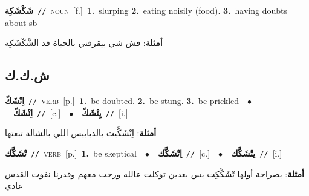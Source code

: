 \documentclass[10pt,a4paper,twoside]{article} %
\begin{document}
\begin{multicols}{2}
{\setlength\topsep{0pt}\textbf{\foreignlanguage{arabic}{شَكْشَكِة}}\ {\color{gray}\texttt{//}\color{black}}\ \textsc{noun}\ [f.]\ \textbf{1.}~slurping  \textbf{2.}~eating noisily (food).  \textbf{3.}~having doubts about sb\  \begin{flushright}\color{gray}\foreignlanguage{arabic}{\textbf{\underline{\foreignlanguage{arabic}{أمثلة}}}: فش شي بيقرفني بالحياة قد الشَّكْشَكِة}\end{flushright}\color{black}} \vspace{2mm}

\vspace{-3mm}
\subsection*{\color{blue}\foreignlanguage{arabic}{ش.ك.ك}\color{blue}{}} 

{\setlength\topsep{0pt}\textbf{\foreignlanguage{arabic}{اِنْشَكّ}}\ {\color{gray}\texttt{//}\color{black}}\ \textsc{verb}\ [p.]\ \textbf{1.}~be doubted.  \textbf{2.}~be stung.  \textbf{3.}~be prickled\ \ $\bullet$\ \ \setlength\topsep{0pt}\textbf{\foreignlanguage{arabic}{اِنْشَكّ}}\ {\color{gray}\texttt{//}\color{black}}\ [c.]\ \ $\bullet$\ \ \setlength\topsep{0pt}\textbf{\foreignlanguage{arabic}{يِنْشَكّ}}\ {\color{gray}\texttt{//}\color{black}}\ [i.]\  \begin{flushright}\color{gray}\foreignlanguage{arabic}{\textbf{\underline{\foreignlanguage{arabic}{أمثلة}}}: اِنْشَكَّيت بالدبابيس اللي بالشالة تبعتها}\end{flushright}\color{black}} \vspace{2mm}

{\setlength\topsep{0pt}\textbf{\foreignlanguage{arabic}{تْشَكَّك}}\ {\color{gray}\texttt{//}\color{black}}\ \textsc{verb}\ [p.]\ \textbf{1.}~be skeptical\ \ $\bullet$\ \ \setlength\topsep{0pt}\textbf{\foreignlanguage{arabic}{اِتْشَكَّك}}\ {\color{gray}\texttt{//}\color{black}}\ [c.]\ \ $\bullet$\ \ \setlength\topsep{0pt}\textbf{\foreignlanguage{arabic}{يتْشَكَّك}}\ {\color{gray}\texttt{//}\color{black}}\ [i.]\  \begin{flushright}\color{gray}\foreignlanguage{arabic}{\textbf{\underline{\foreignlanguage{arabic}{أمثلة}}}: بصراحة أولها تْشَكَّكِت بس بعدين توكلت عالله ورحت معهم وقدرنا نفوت القدس عادي}\end{flushright}\color{black}} \vspace{2mm}


\end{multicols}
\end{document}
